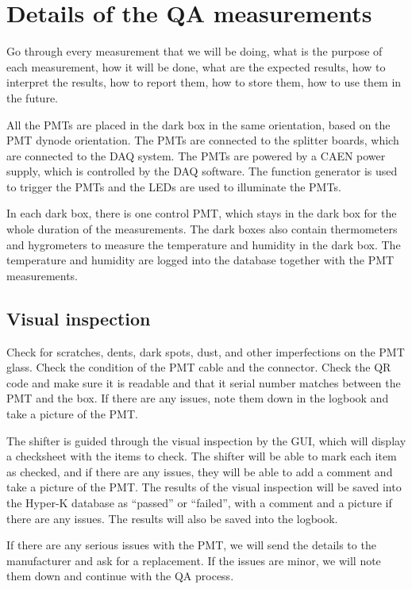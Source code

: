 \documentclass[12pt,a4paper]{article}
\begin{document}
\section{Details of the QA measurements}\label{sec:QAMeasurements}

Go through every measurement that we will be doing, what is the purpose of each measurement, how it will be done, what are the expected results, how to interpret the results, how to report them, how to store them, how to use them in the future.

All the PMTs are placed in the dark box in the same orientation, based on the PMT dynode orientation. The PMTs are connected to the splitter boards, which are connected to the DAQ system. The PMTs are powered by a CAEN power supply, which is controlled by the DAQ software. The function generator is used to trigger the PMTs and the LEDs are used to illuminate the PMTs.

In each dark box, there is one control PMT, which stays in the dark box for the whole duration of the measurements. The dark boxes also contain thermometers and hygrometers to measure the temperature and humidity in the dark box. The temperature and humidity are logged into the database together with the PMT measurements.

\subsection{Visual inspection}
Check for scratches, dents, dark spots, dust, and other imperfections on the PMT glass. Check the condition of the PMT cable and the connector. Check the QR code and make sure it is readable and that it serial number matches between the PMT and the box. If there are any issues, note them down in the logbook and take a picture of the PMT.

The shifter is guided through the visual inspection by the GUI, which will display a checksheet with the items to check. The shifter will be able to mark each item as checked, and if there are any issues, they will be able to add a comment and take a picture of the PMT. The results of the visual inspection will be saved into the Hyper-K database as ``passed'' or ``failed'', with a comment and a picture if there are any issues. The results will also be saved into the logbook.

If there are any serious issues with the PMT, we will send the details to the manufacturer and ask for a replacement. If the issues are minor, we will note them down and continue with the QA process.
\end{document}
